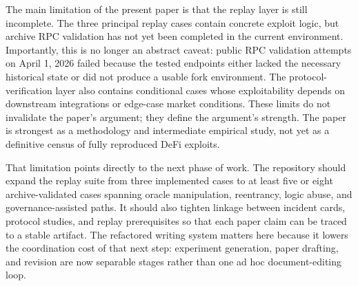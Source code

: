 The main limitation of the present paper is that the replay layer is still incomplete. The three principal replay cases contain concrete exploit logic, but archive RPC validation has not yet been completed in the current environment. Importantly, this is no longer an abstract caveat: public RPC validation attempts on April 1, 2026 failed because the tested endpoints either lacked the necessary historical state or did not produce a usable fork environment. The protocol-verification layer also contains conditional cases whose exploitability depends on downstream integrations or edge-case market conditions. These limits do not invalidate the paper's argument; they define the argument's strength. The paper is strongest as a methodology and intermediate empirical study, not yet as a definitive census of fully reproduced DeFi exploits.

That limitation points directly to the next phase of work. The repository should expand the replay suite from three implemented cases to at least five or eight archive-validated cases spanning oracle manipulation, reentrancy, logic abuse, and governance-assisted paths. It should also tighten linkage between incident cards, protocol studies, and replay prerequisites so that each paper claim can be traced to a stable artifact. The refactored writing system matters here because it lowers the coordination cost of that next step: experiment generation, paper drafting, and revision are now separable stages rather than one ad hoc document-editing loop.
